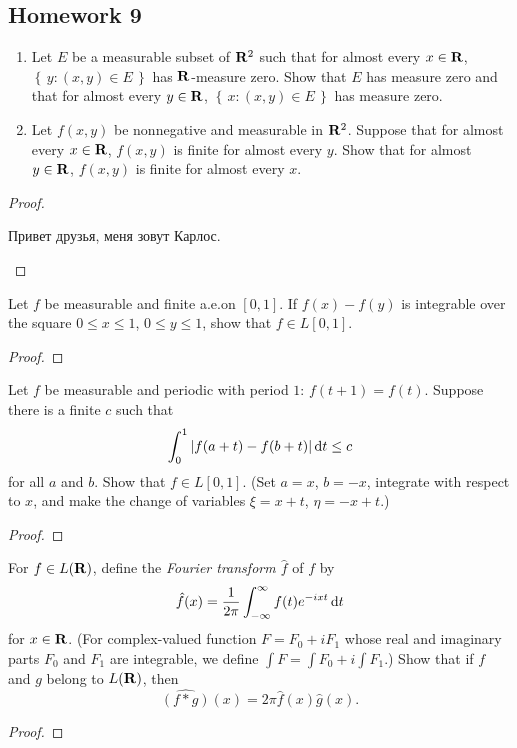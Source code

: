 \subsection{Homework 9}
\begin{problem}
\begin{enumerate}[label=(\alph*)]
\item Let $E$ be a measurable subset of $\mathbf{R}^2$ such that for almost every
  $x\in\mathbf{R}$, $\left\{\,y:(x,y)\in E\,\right\}$ has
  $\mathbf{R}$-measure zero. Show that $E$ has measure zero and that for almost
  every $y\in\mathbf{R}$, $\left\{\,x:(x,y)\in E\,\right\}$ has
  measure zero.
\item Let $f(x,y)$ be nonnegative and measurable in $\mathbf{R}^2$. Suppose that
  for almost every $x\in\mathbf{R}$, $f(x,y)$ is finite for almost every
  $y$. Show that for almost $y\in\mathbf{R}$, $f(x,y)$ is finite for almost
  every $x$.
\end{enumerate}
\end{problem}
\begin{proof}
\begin{russian}
Привет друзья, меня зовут Карлос.
\end{russian}
\end{proof}

\begin{problem}
Let $f$ be measurable and finite a.e.\@ on $[0,1]$. If $f(x)-f(y)$ is
integrable over the square $0\leq x\leq 1$, $0\leq y\leq 1$, show that
$f\in L[0,1]$.
\end{problem}
\begin{proof}
\end{proof}

\begin{problem}
Let $f$ be measurable and periodic with period $1$: $f(t+1)=f(t)$. Suppose
there is a finite $c$ such that
\[
\int_0^1|f(a+t)-f(b+t)|\mathop{}\!\mathrm{d} t\leq c
\]
for all $a$ and $b$. Show that $f\in L[0,1]$. (Set $a=x$, $b=-x$, integrate
with respect to $x$, and make the change of variables $\xi=x+t$,
$\eta=-x+t$.)
\end{problem}
\begin{proof}
\end{proof}

\begin{problem}
For $f\in L(\mathbf{R})$, define the \emph{Fourier transform $\hat f$} of $f$
by
\[
\hat f(x)=\frac{1}{2\pi}\int_{-\infty}^\infty f(t)e^{-ixt}\mathop{}\!\mathrm{d} t
\]
for $x\in\mathbf{R}$. (For complex-valued function $F=F_0+iF_1$ whose real and
imaginary parts $F_0$ and $F_1$ are integrable, we define $\int F=\int
F_0+i\int F_1$.) Show that if $f$ and $g$ belong to $L(\mathbf{R})$, then
\[
\widehat{(f*g)}(x)=2\pi\hat f(x)\hat g(x).
\]
\end{problem}
\begin{proof}
\end{proof}


